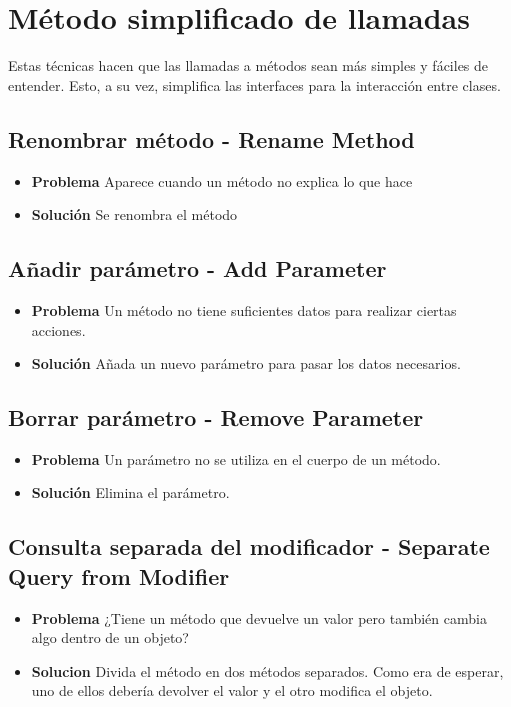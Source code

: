 \documentclass[11pt,a4paper,oneside]{book}
\begin{document}
\section{Método simplificado de llamadas}

Estas técnicas hacen que las llamadas a métodos sean más simples y fáciles de entender. Esto, a su vez, simplifica las interfaces para la interacción entre clases.

\subsection{Renombrar método - Rename Method}
\label{renamemethod}
\begin{itemize}
    \item \textbf{Problema} Aparece cuando un método no explica lo que hace 
    \item \textbf{Solución} Se renombra el método
\end{itemize}

\subsection{Añadir parámetro - Add Parameter}
\label{addparameter}
\begin{itemize}
    \item \textbf{Problema} Un método no tiene suficientes datos para realizar ciertas acciones.
    \item \textbf{Solución} Añada un nuevo parámetro para pasar los datos necesarios.
\end{itemize}
    
\subsection{Borrar parámetro - Remove Parameter}
\label{removeparameter}
\begin{itemize}
    \item \textbf{Problema} Un parámetro no se utiliza en el cuerpo de un método.
    \item \textbf{Solución} Elimina el parámetro.
\end{itemize}

\subsection{Consulta separada del modificador - Separate Query from Modifier}
\label{separatequeryfrommodifier}
\begin{itemize}
    \item \textbf{Problema} ¿Tiene un método que devuelve un valor pero también cambia algo dentro de un objeto?
    \item \textbf{Solucion} Divida el método en dos métodos separados. Como era de esperar, uno de ellos debería devolver el valor y el otro modifica el objeto.
\end{itemize}
\end{document}
